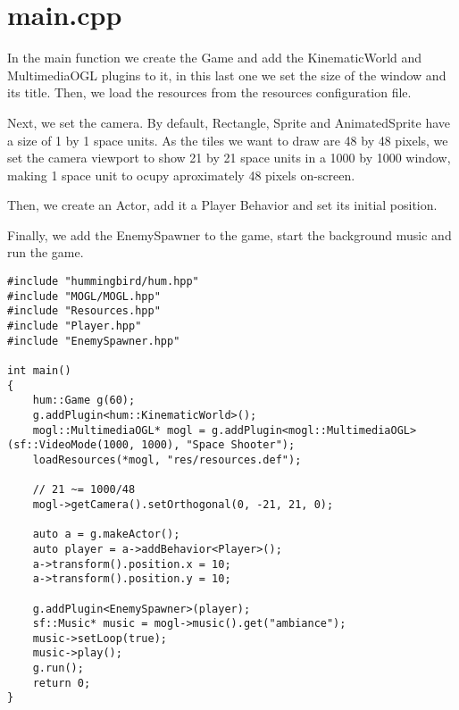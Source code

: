 \section{main.cpp}

In the main function we create the Game and add the KinematicWorld and MultimediaOGL plugins 
to it, in this last one we set the size of the window and its title. Then, we load 
the resources from the resources configuration file.

Next, we set the camera. By default, Rectangle, Sprite and AnimatedSprite have a size of 1 by 1 space units. 
As the tiles we want to draw are 48 by 48 pixels, we set the camera viewport to show 21 by 21 space units in 
a 1000 by 1000 window, making 1 space unit to ocupy aproximately 48 pixels on-screen.

Then, we create an Actor, add it a Player Behavior and set its initial position.

Finally, we add the EnemySpawner to the game, start the background music and run the game.

\begin{lstlisting}
#include "hummingbird/hum.hpp"
#include "MOGL/MOGL.hpp"
#include "Resources.hpp"
#include "Player.hpp"
#include "EnemySpawner.hpp"

int main()
{
    hum::Game g(60);
    g.addPlugin<hum::KinematicWorld>();
    mogl::MultimediaOGL* mogl = g.addPlugin<mogl::MultimediaOGL>(sf::VideoMode(1000, 1000), "Space Shooter");
    loadResources(*mogl, "res/resources.def");

    // 21 ~= 1000/48
    mogl->getCamera().setOrthogonal(0, -21, 21, 0);

    auto a = g.makeActor();
    auto player = a->addBehavior<Player>();
    a->transform().position.x = 10;
    a->transform().position.y = 10;

    g.addPlugin<EnemySpawner>(player);
    sf::Music* music = mogl->music().get("ambiance");
    music->setLoop(true);
    music->play();
    g.run();
    return 0;
}
\end{lstlisting}
